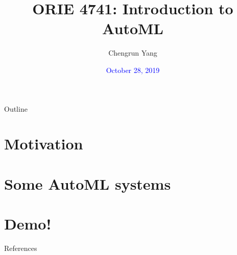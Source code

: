 \documentclass{beamer}
\title{ORIE 4741: Introduction to AutoML}
\date{\textcolor{blue}{October 28, 2019}}
\author{Chengrun Yang \\
	[1ex]
}
\begin{document}
\begin{frame}
\titlepage
\end{frame}


 \begin{frame}{Outline}
 \tableofcontents
 \end{frame}

\section{Motivation}



\section{Some AutoML systems}


\section{Demo!}


\begin{frame}[allowframebreaks]{References}


\end{frame}
\end{document}
